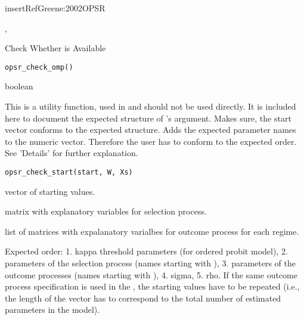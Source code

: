 \documentclass[letterpaper]{book}
\begin{document}
%
\begin{References}
\bsl{}insertRefGreene:2002OPSR
\end{References}
%
\begin{SeeAlso}
, 
\end{SeeAlso}
%
\begin{Description}
Check Whether  is Available
\end{Description}
%
\begin{Usage}
\begin{verbatim}
opsr_check_omp()
\end{verbatim}
\end{Usage}
%
\begin{Value}
boolean
\end{Value}
%
\begin{Description}
This is a utility function, used in  and should not be used directly.
It is included here to document the expected structure of 's  argument.
Makes sure, the start vector conforms to the expected structure. Adds the
expected parameter names to the numeric vector. Therefore the user has to
conform to the expected order. See 'Details' for further explanation.
\end{Description}
%
\begin{Usage}
\begin{verbatim}
opsr_check_start(start, W, Xs)
\end{verbatim}
\end{Usage}
%
\begin{Arguments}
\begin{ldescription}
\item[\code{start}] vector of starting values.

\item[\code{W}] matrix with explanatory variables for selection process.

\item[\code{Xs}] list of matrices with expalanatory varialbes for outcome process for each regime.
\end{ldescription}
\end{Arguments}
%
\begin{Details}
Expected order: 1. kappa threshold parameters (for ordered probit model),
2. parameters of the selection process (names starting with ), 3. parameters
of the outcome processes (names starting with ), 4. sigma, 5. rho.
If the same outcome process specification is used in the , the starting
values have to be repeated (i.e., the length of the  vector has to
correspond to the total number of estimated parameters in the model).
\end{Details}
\end{document}
